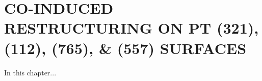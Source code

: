 \chapter{CO-INDUCED RESTRUCTURING ON PT (321), (112), (765), \& (557) SURFACES}



In this chapter...

